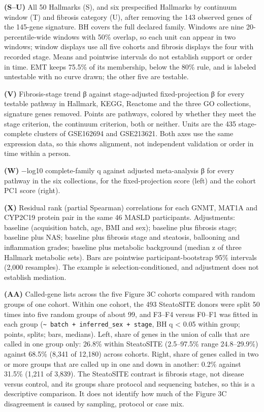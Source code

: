 \textbf{(S--U)} All 50 Hallmarks (S), and six prespecified Hallmarks by continuum window (T) and fibrosis category (U), after removing the 143 observed genes of the 145-gene signature. BH covers the full declared family. Windows are nine 20-percentile-wide windows with 50\% overlap, so each unit can appear in two windows; window displays use all five cohorts and fibrosis displays the four with recorded stage. Means and pointwise intervals do not establish support or order in time. EMT keeps 75.5\% of its membership, below the 80\% rule, and is labeled untestable with no curve drawn; the other five are testable.

\textbf{(V)} Fibrosis-stage trend β against stage-adjusted fixed-projection β for every testable pathway in Hallmark, KEGG, Reactome and the three GO collections, signature genes removed. Points are pathways, colored by whether they meet the stage criterion, the continuum criterion, both or neither. Units are the 435 stage-complete clusters of GSE162694 and GSE213621. Both axes use the same expression data, so this shows alignment, not independent validation or order in time within a person.

\textbf{(W)} −log10 complete-family q against adjusted meta-analysis β for every pathway in the six collections, for the fixed-projection score (left) and the cohort PC1 score (right).

\textbf{(X)} Residual rank (partial Spearman) correlations for each GNMT, MAT1A and CYP2C19 protein pair in the same 46 MASLD participants. Adjustments: baseline (acquisition batch, age, BMI and sex); baseline plus fibrosis stage; baseline plus NAS; baseline plus fibrosis stage and steatosis, ballooning and inflammation grades; baseline plus metabolic background (median z of three Hallmark metabolic sets). Bars are pointwise participant-bootstrap 95\% intervals (2,000 resamples). The example is selection-conditioned, and adjustment does not establish mediation.

\textbf{(AA)} Called-gene lists across the five Figure 3C cohorts compared with random groups of one cohort. Within one cohort, the 493 SteatoSITE donors were split 50 times into five random groups of about 99, and F3--F4 versus F0--F1 was fitted in each group (\texttt{\textasciitilde{}\ batch\ +\ inferred\_\allowbreak{}sex\ +\ stage}, BH q \textless{} 0.05 within group; points, splits; bars, medians). Left, share of genes in the union of calls that are called in one group only: 26.8\% within SteatoSITE (2.5--97.5\% range 24.8--29.9\%) against 68.5\% (8,341 of 12,180) across cohorts. Right, share of genes called in two or more groups that are called up in one and down in another: 0.2\% against 31.5\% (1,211 of 3,839). The SteatoSITE contrast is fibrosis stage, not disease versus control, and its groups share protocol and sequencing batches, so this is a descriptive comparison. It does not identify how much of the Figure 3C disagreement is caused by sampling, protocol or case mix.

